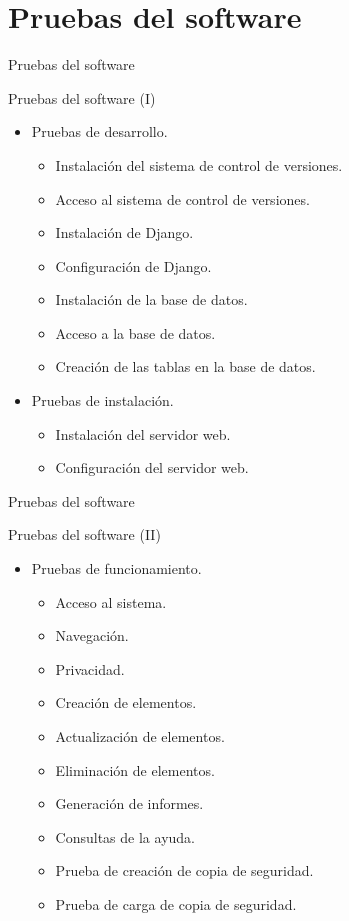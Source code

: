\documentclass[10pt, hyperref={pdfpagelabels=false}]{beamer}
\begin{document}
  \section{Pruebas del software}
    \begin{frame}{Pruebas del software}
      \begin{block}{Pruebas del software (I)}
          \begin{itemize}
          \item Pruebas de desarrollo.
          \begin{itemize}
            \item Instalación del sistema de control de versiones.
            \item Acceso al sistema de control de versiones.
            \item Instalación de Django.
            \item Configuración de Django.
            \item Instalación de la base de datos.
            \item Acceso a la base de datos.
            \item Creación de las tablas en la base de datos.
          \end{itemize}
          \item Pruebas de instalación.
          \begin{itemize}
            \item Instalación del servidor web.
            \item Configuración del servidor web.
          \end{itemize}
          \end{itemize}
      \end{block}
    \end{frame}

    \begin{frame}{Pruebas del software}
      \begin{block}{Pruebas del software (II)}
        \begin{itemize}
          \item Pruebas de funcionamiento.
          \begin{itemize}
            \item Acceso al sistema.
            \item Navegación.
            \item Privacidad.
            \item Creación de elementos.
            \item Actualización de elementos.
            \item Eliminación de elementos.
            \item Generación de informes.
            \item Consultas de la ayuda.
            \item Prueba de creación de copia de seguridad.
            \item Prueba de carga de copia de seguridad.
          \end{itemize}
          \end{itemize}
        \end{block}
    \end{frame}
\end{document}
